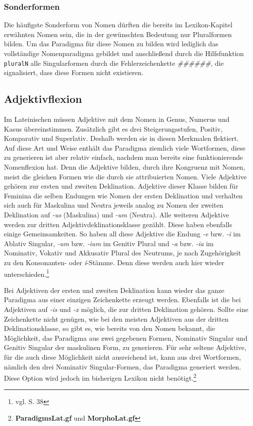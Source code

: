 \documentclass[fontsize=12pt,abstract=on,titlepage,bibliography=totoc,ngerman,listof=totoc]{scrreprt}
\begin{document}
\subsubsection{Sonderformen}
Die häufigste Sonderform von Nomen dürften die bereits im Lexikon-Kapitel erwähnten Nomen sein, die in der gewünschten Bedeutung nur Pluralformen bilden. Um das Paradigma für diese Nomen zu bilden wird lediglich das vollständige Nomenparadigma gebildet und anschließend durch die Hilfsfunktion \texttt{pluralN} alle Singularformen durch die Fehlerzeichenkette \textit{\#\#\#\#\#\#}, die signalisiert, dass diese Formen nicht existieren.
\subsection{Adjektivflexion}
\label{subsec:adjektiv}
Im Lateinischen müssen Adjektive mit dem Nomen in Genus, Numerus und Kasus übereinstimmen. Zusätzlich gibt es drei Steigerungsstufen, Positiv, Komparativ und Superlativ. Deshalb werden sie in diesen Merkmalen flektiert. Auf diese Art und Weise enthält das Paradigma ziemlich viele Wortformen, diese zu generieren ist aber relativ einfach, nachdem man bereits eine funktionierende Nomenflexion hat. Denn die Adjektive bilden, durch ihre Kongruenz mit Nomen, meist die gleichen Formen wie die durch sie attribuierten Nomen. Viele Adjektive gehören zur ersten und zweiten Deklination. Adjektive dieser Klasse bilden für Feminina die selben Endungen wie Nomen der ersten Deklination und verhalten sich auch für Maskulina und Neutra jeweils analog zu Nomen der zweiten Deklination auf \textit{-us} (Maskulina) und \textit{-um} (Neutra). Alle weiteren Adjektive werden zur dritten Adjektivdeklinationsklasse gezählt. Diese haben ebenfalls einige Gemeinsamkeiten. So haben all diese Adjektive die Endung \textit{-e} bzw. \textit{-i} im Ablativ Singular, \textit{-um} bzw. \textit{-ium} im Genitiv Plural und \textit{-a} bzw. \textit{-ia} im Nominativ, Vokativ und Akkusativ Plural des Neutrums, je nach Zugehörigkeit zu den Konsonanten- oder \textit{ǐ}-Stämme. Denn diese werden auch hier wieder unterschieden.\footnote{vgl. \cite{BAYER-LINDAUER1994} S. 38} \par
Bei Adjektiven der ersten und zweiten Deklination kann wieder das ganze Paradigma aus einer einzigen Zeichenkette erzeugt werden. Ebenfalls ist die bei Adjektiven auf \textit{-is} und \textit{-x} möglich, die zur dritten Deklination gehören. Sollte eine Zeichenkette nicht genügen, wie bei den meisten Adjektiven aus der dritten Deklinationsklasse, so gibt es, wie bereits von den Nomen bekannt, die Möglichkeit, das Paradigma aus zwei gegebenen Formen, Nominativ Singular und Genitiv Singular der maskulinen Form, zu generieren. Für sehr seltene Adjektive, für die auch diese Möglichkeit nicht ausreichend ist, kann aus drei Wortformen, nämlich den drei Nominativ Singular-Formen, das Paradigma generiert werden. Diese Option wird jedoch im bisherigen Lexikon nicht benötigt.\footnote{\textbf{ParadigmsLat.gf} und \textbf{MorphoLat.gf}} \par
\end{document}
